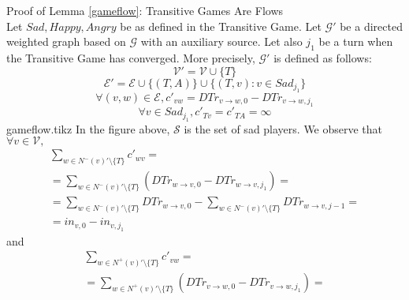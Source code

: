 \begin{sepproof}{Proof of Lemma \ref{gameflow}: Transitive Games Are Flows} \ \\
\label{gameflowproof}
  Let $Sad, Happy, Angry$ be as defined in the Transitive Game. Let $\mathcal{G}'$ be a directed weighted graph based on
  $\mathcal{G}$ with an auxiliary source. Let also $j_1$ be a turn when the Transitive Game has converged. More
  precisely, $\mathcal{G}'$ is defined as follows:
  \begin{equation*}
    \mathcal{V}' = \mathcal{V} \cup \{T\}
  \end{equation*}
  \begin{equation*}
    \mathcal{E}' = \mathcal{E} \cup \{(T, A)\} \cup \{(T, v) : v \in Sad_{j_1}\}
  \end{equation*}
  \begin{equation*}
    \forall (v, w) \in \mathcal{E}, c'_{vw} = DTr_{v \rightarrow w, 0} - DTr_{v \rightarrow w, j_1}
  \end{equation*}
  \begin{equation*}
    \forall v \in Sad_{j_1}, c'_{Tv} = c'_{TA} = \infty
  \end{equation*}
  {gameflow.tikz}
  In the figure above, $\mathcal{S}$ is the set of sad players. We observe that $\forall v \in \mathcal{V},$
  \begin{equation}
  \label{gameflowin}
  \begin{gathered}
    \sum\limits_{w \in N^{-}\left(v\right)' \setminus \{T\}}c'_{wv} = \\
    = \sum\limits_{w \in N^{-}\left(v\right)' \setminus \{T\}}\left(DTr_{w \rightarrow v, 0} -
    DTr_{w \rightarrow v, j_1}\right) = \\
    = \sum\limits_{w \in N^{-}\left(v\right)' \setminus \{T\}}DTr_{w \rightarrow v, 0} -
    \sum\limits_{w \in N^{-}\left(v\right)' \setminus \{T\}}DTr_{w \rightarrow v, j-1} =  \\
    = in_{v, 0} - in_{v, j_1}
  \end{gathered}
  \end{equation}
  and
  \begin{equation}
  \label{gameflowout}
  \begin{gathered}
    \sum\limits_{w \in N^{+}\left(v\right)' \setminus \{T\}}c'_{vw} = \\
    = \sum\limits_{w \in N^{+}\left(v\right)' \setminus \{T\}}\left(DTr_{v \rightarrow w, 0} -
    DTr_{v \rightarrow w, j_1}\right) = \\

\end{gathered}
\end{equation}
\end{sepproof}
